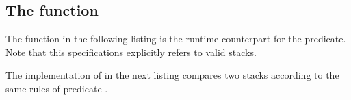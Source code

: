 
\subsection{The function \stackequal}

The function \stackequal in the following listing
is  the runtime counterpart for the  predicate.
Note that this specifications explicitly refers to valid stacks.



The implementation of \stackequal in the next listing
compares two stacks according to the same rules of predicate \StackEqual.



